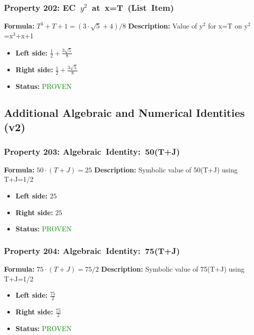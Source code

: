 \subsubsection*{Property 202: EC~$y^{2}$~at~x=T~(List~Item)}
\textbf{Formula:} $T^3+T+1=(3 \cdot \sqrt{5}+4)/8$
\textbf{Description:} Value of y$^2$ for x=T on y$^2$=x$^3$+x+1

\begin{itemize}
\item \textbf{Left side:} $\frac{1}{2} + \frac{3 \sqrt{5}}{8}$
\item \textbf{Right side:} $\frac{1}{2} + \frac{3 \sqrt{5}}{8}$
\item \textbf{Status:} \textcolor{green}{PROVEN}
\end{itemize}


\subsection{Additional Algebraic and Numerical Identities (v2)}

\subsubsection*{Property 203: Algebraic~Identity:~50(T+J)}
\textbf{Formula:} $50 \cdot (T+J) = 25$
\textbf{Description:} Symbolic value of 50(T+J) using T+J=1/2

\begin{itemize}
\item \textbf{Left side:} $25$
\item \textbf{Right side:} $25$
\item \textbf{Status:} \textcolor{green}{PROVEN}
\end{itemize}

\subsubsection*{Property 204: Algebraic~Identity:~75(T+J)}
\textbf{Formula:} $75 \cdot (T+J) = 75/2$
\textbf{Description:} Symbolic value of 75(T+J) using T+J=1/2

\begin{itemize}
\item \textbf{Left side:} $\frac{75}{2}$
\item \textbf{Right side:} $\frac{75}{2}$
\item \textbf{Status:} \textcolor{green}{PROVEN}
\end{itemize}


